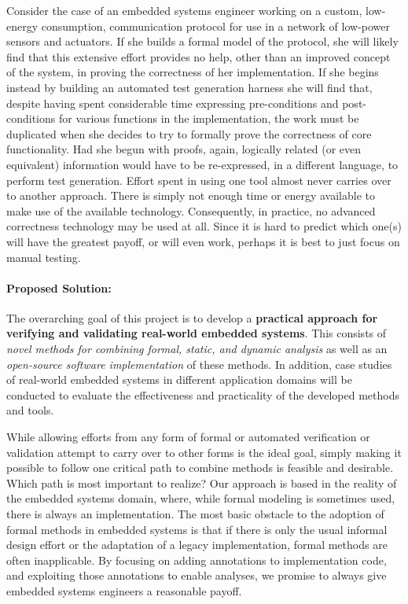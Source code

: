 Consider the case of an embedded systems engineer working on a custom, low-energy consumption, communication protocol for use in a network of low-power sensors and actuators.  If she builds a formal model of the protocol, she will likely find that this extensive effort provides no help, other than an improved concept of the system, in proving the correctness of her implementation.  If she begins instead by building an automated test generation harness she will find that, despite having spent considerable time expressing pre-conditions and post-conditions for various functions in the implementation, the work must be duplicated when she decides to try to formally prove the correctness of core functionality.  Had she begun with proofs, again, logically related (or even equivalent) information would have to be re-expressed, in a different language, to perform test generation.  Effort spent in using one tool almost never carries over to another approach.  There is simply not enough time or energy available to make use of the available technology.  Consequently, in practice, no advanced correctness technology may be used at all.  Since it is hard to predict which one(s) will have the greatest payoff, or will even work, perhaps it is best to just focus on manual testing.


\paragraph{Proposed Solution:}
The overarching goal of this project is to develop a \textbf{practical approach for verifying and validating real-world embedded systems}.
This consists of \emph{novel methods for combining formal, static, and dynamic analysis} as well as an \emph{open-source software implementation} of these methods.
In addition, case studies of real-world embedded systems in different application domains will be conducted to evaluate the effectiveness and practicality of the developed methods and tools.

While allowing efforts from any form of formal or automated verification or validation attempt to carry over to other forms %
is the ideal goal, simply making it possible to follow one critical path to combine methods is feasible and desirable.
%
Which path is most important to realize?  Our approach is based in the reality of the embedded systems domain, where, while formal modeling is sometimes used, there is %
always an implementation.  The most basic obstacle to the adoption of formal methods in embedded systems is that if there is only the usual informal design effort or the adaptation of a legacy implementation, formal methods are often inapplicable.  By focusing on adding annotations to implementation code, and exploiting those annotations to enable analyses, we promise to always give embedded systems engineers a reasonable payoff.

